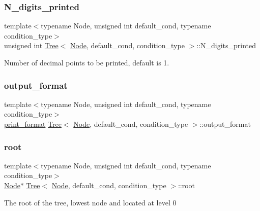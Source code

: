 \subsubsection{\texorpdfstring{N\+\_\+digits\+\_\+printed}{N\_digits\_printed}}
{\footnotesize\ttfamily template$<$typename Node, unsigned int default\+\_\+cond, typename condition\+\_\+type$>$ \\
unsigned int \hyperlink{class_tree}{Tree}$<$ \hyperlink{struct_node}{Node}, default\+\_\+cond, condition\+\_\+type $>$\+::N\+\_\+digits\+\_\+printed\hspace{0.3cm}{\ttfamily [private]}}

Number of decimal points to be printed, default is 1. \mbox{\label{class_tree_aeaf14b04be7b3de8214fcc5c1545ebde}} 
\subsubsection{\texorpdfstring{output\+\_\+format}{output\_format}}
{\footnotesize\ttfamily template$<$typename Node, unsigned int default\+\_\+cond, typename condition\+\_\+type$>$ \\
\hyperlink{_tree_8hpp_a73f5f76e6617ce240bad0b57b80be996}{print\+\_\+format} \hyperlink{class_tree}{Tree}$<$ \hyperlink{struct_node}{Node}, default\+\_\+cond, condition\+\_\+type $>$\+::output\+\_\+format\hspace{0.3cm}{\ttfamily [private]}}

\mbox{\label{class_tree_ae1cb548295b2e451164d89b16ac72d17}} 
\subsubsection{\texorpdfstring{root}{root}}
{\footnotesize\ttfamily template$<$typename Node, unsigned int default\+\_\+cond, typename condition\+\_\+type$>$ \\
\hyperlink{struct_node}{Node}$\ast$ \hyperlink{class_tree}{Tree}$<$ \hyperlink{struct_node}{Node}, default\+\_\+cond, condition\+\_\+type $>$\+::root\hspace{0.3cm}{\ttfamily [private]}}

The root of the tree, lowest node and located at level 0 

